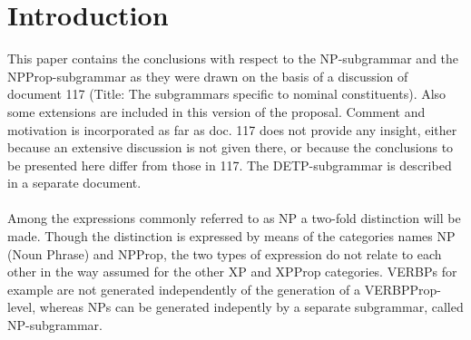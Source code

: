    \RosDate{\today}
   \MakeRosTitle
%
%   
%   
%

\section{Introduction}
This paper contains the conclusions with respect to the NP-subgrammar
and the NPProp-subgrammar 
as they were drawn on the basis of a discussion of document 117
(Title: 
The subgrammars specific to 
nominal constituents). Also some extensions are included in this version of the
proposal. Comment and motivation is incorporated as far as doc. 117 does not
provide any insight, either because an extensive discussion is not given there,
or because the conclusions to be presented here differ from those in 117.
The DETP-subgrammar is described in a separate document.\\ \\ 
Among the expressions commonly referred to as NP a two-fold distinction will
be made. Though the distinction is expressed by means of the categories names
NP (Noun Phrase) and NPProp, the two types of expression do not 
relate to each other in the way assumed for the other XP and XPProp categories.
VERBPs for example are not generated independently of the 
generation of
a VERBPProp-level, whereas NPs can be generated indepently by 
a separate subgrammar, called NP-subgrammar.

